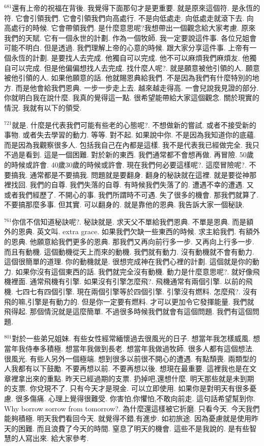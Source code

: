 \documentclass{book}
\begin{document}
$^{681}$還有上帝的祝福在背後.
我覺得下面那句才是更重要.
就是原來這個符.
是永恆的符.
它會引領我們.
它會引領我們向高處行.
不是向低處走.
向低處走就滾下去.
向高處行的時候.
它會帶領我們.
是什麼意思呢?我想帶出一個觀念給大家考慮.
原來我們的天賦.
它有一個永世的計劃.
作為一個牧師.
我一定要說這件事.
各位兄姐會可能不明白.
但是透過.
我們理解上帝的心意的時候.
跟大家分享這件事.
上帝有一個永恆的計劃.
是要找人去完成.
他獨自可以完成.
他不可以麻煩我們麻煩友.
他獨自可以完成.
但是他偏偏想找人去完成.
找什麼人呢?.
就是願意被他引領的人.
願意被他引領的人.
如果他願意的話.
他就賜恩典給我們.
不是因為我們有什麼特別的地方.
而是他會給我們恩典.
一步一步走上去.
越來越走得高.
一會兒說我見證的部分.
你就明白我在說什麼.
我真的覺得這一點.
很希望能帶給大家這個觀念.
關於現實的情況.
我就有以下的領受.

$^{721}$就是.
什麼是代表我們可能有些老的心態呢?.
不想做新的嘗試.
或者不接受新的事物.
或者失去學習的動力.
等等.
對不起.
如果說中你.
不是因為我知道你的底蘊.
而是因為我觀察很多人.
包括我自己在內都是這樣.
我不是代表我已經做完全.
我只不過是看到.
這是一個困難.
對於新的東西.
我們通常都不會想再做.
再冒險.
50歲的時候或許會.
40歲30歲的時候或許會.
現在我們何必要這樣呢?.
這麼冒險呢?.
不要搞我.
通常都是不要搞我.
問題就是要翻身.
翻身的秘訣就在這裡.
就是要從神那裡找回.
我們的自尊.
我們失落的自尊.
有時候我們失落了的.
遭遇不幸的遭遇.
又或者我們經歷了.
不開心的事.
我們所謂時不可遇.
失了很多的機會.
那我們就算了.
不要搞那麼多事.
但其實.
可以翻身的.
就是靠他的恩典.
我告訴大家一個秘訣.

$^{761}$你信不信知道秘訣呢?.
秘訣就是.
求天父不單給我們恩典.
不單是恩典.
而是額外的恩典.
英文叫.
extra grace.
如果我們欠缺一些東西的時候.
求主給我們.
有額外的恩典.
他願意給我們更多的恩典.
那我們又再向前行多一步.
又再向上行多一步.
而且有動機.
這個動機從天上而來的動機.
我們就有動力.
沒有動機就不會有動力.
這個很簡單的道理.
你的動機就是.
很想完成神在我們心裡的計劃.
這個就是你的動力.
如果你沒有這個東西的話.
我們就完全沒有動機.
動力是什麼意思呢?.
就好像飛機裡面.
通常飛機有引擎.
如果沒有引擎怎麼飛?.
飛機通常有兩個引擎.
以前的飛機.
七四七有四個引擎.
現在兩個引擎等於四個引擎.
引擎沒有燃料.
怎麼飛?.
沒有飛的嘛,引擎是有動力的.
但是你一定要有燃料.
才可以更加令它發揮能量.
我們就飛得起.
那個情況就是這麼簡單.
不過很多時候我們就會有這個問題.
我們有這個問題.

$^{801}$對於一些弟兄姐妹.
有些女性經常緬懷過去很風光的日子.
想當年我怎樣威風.
想當年我侍奉多積極.
想當年我做到長老.
想當年我做過牧師.
很多人都有這個想法.
很風光.
有些人另外一個極端.
想到很多以前很不開心的遭遇.
有點頹喪.
兩類型的人我都有以下鼓勵.
不要再想以前.
不要再想以後.
想現在最重要.
這裡我也是在文章裡拿出來的重點.
昨天已經過期的支票.
扔掉吧,還想什麼.
明天那些就是未到期的支票.
你兌現不了.
只有今天才是現金.
可以立即使用.
如果你是對明天有很多憂慮.
很多傷痛.
心理上覺得很難受.
你害怕,你懼怕,不敢向前走.
這句話希望幫到你.
Why borrow sorrow from tomorrow?.
為什麼還這樣被它折磨.
只看今天.
今天我們能夠積極.
明天我們看回今天.
就覺得不錯,有進步.
如初旅途.
因為憂慮就是使用昨天的困難.
而且浪費了今天的時間.
窒息了明天的機會.
這些不是我說的.
是有些智慧的人寫出來.
給大家參考.
\end{document}
